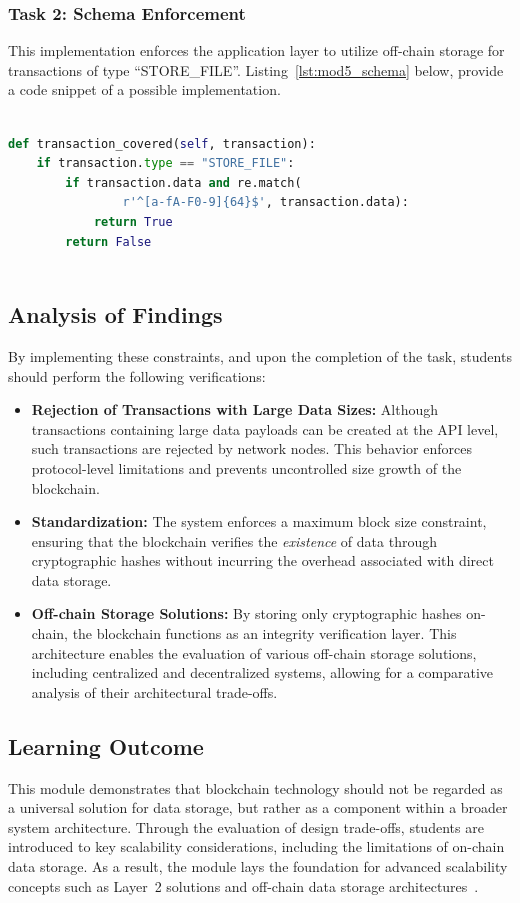 \subsubsection*{Task 2: Schema Enforcement}
This implementation enforces the application layer to utilize off-chain storage for transactions of type \enquote{STORE\_FILE}. Listing~\ref{lst:mod5_schema} below, provide a code snippet of a possible implementation.

\begin{lstlisting}[language=Python, caption=Transaction Schema Validation, label=lst:mod5_schema]

def transaction_covered(self, transaction):
    if transaction.type == "STORE_FILE":
        if transaction.data and re.match(
                r'^[a-fA-F0-9]{64}$', transaction.data):
            return True
        return False
    
\end{lstlisting}


\subsection{Analysis of Findings}
By implementing these constraints, and upon the completion of the task, students should perform the following verifications:
\begin{itemize}
    \item \textbf{Rejection of Transactions with Large Data Sizes:} Although transactions containing large data payloads can be created at the API level, such transactions are rejected by network nodes. This behavior enforces protocol-level limitations and prevents uncontrolled size growth of the blockchain.

    \item \textbf{Standardization:} The system enforces a maximum block size constraint, ensuring that the blockchain verifies the \textit{existence} of data through cryptographic hashes without incurring the overhead associated with direct data storage.
    \item \textbf{Off-chain Storage Solutions:} By storing only cryptographic hashes on-chain, the blockchain functions as an integrity verification layer. This architecture enables the evaluation of various off-chain storage solutions, including centralized and decentralized systems, allowing for a comparative analysis of their architectural trade-offs.
\end{itemize}

\subsection{Learning Outcome}
This module demonstrates that blockchain technology should not be regarded as a universal solution for data storage, but rather as a component within a broader system architecture. Through the evaluation of design trade-offs, students are introduced to key scalability considerations, including the limitations of on-chain data storage. As a result, the module lays the foundation for advanced scalability concepts such as Layer~2 solutions and off-chain data storage architectures~\cite{l2Protocols, scallingWithRollups, ipfsEvaluation}.

